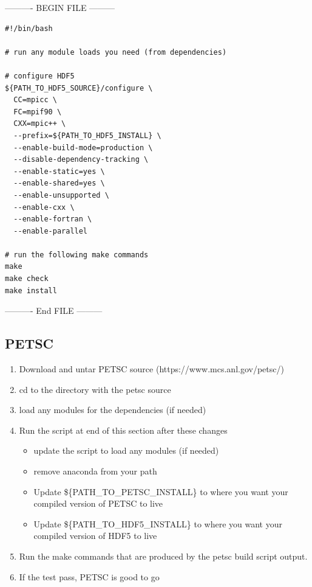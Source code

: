 \documentclass{article}
\begin{document}
---------- BEGIN FILE ---------
\begin{verbatim}
#!/bin/bash

# run any module loads you need (from dependencies)

# configure HDF5
${PATH_TO_HDF5_SOURCE}/configure \
  CC=mpicc \
  FC=mpif90 \
  CXX=mpic++ \
  --prefix=${PATH_TO_HDF5_INSTALL} \
  --enable-build-mode=production \
  --disable-dependency-tracking \
  --enable-static=yes \
  --enable-shared=yes \
  --enable-unsupported \
  --enable-cxx \
  --enable-fortran \
  --enable-parallel

# run the following make commands
make 
make check 
make install
\end{verbatim}
---------- End FILE ---------

\subsection{PETSC} %
\label{sub:petsc}
\begin{enumerate}
  \item Download and untar PETSC source (https://www.mcs.anl.gov/petsc/)
  \item cd to the directory with the petsc source
  \item load any modules for the dependencies (if needed)
  \item Run the script at end of this section after these changes
  \begin{itemize}
    \item update the script to load any modules (if needed)
    \item remove anaconda from your path
    \item Update \$\{PATH\_TO\_PETSC\_INSTALL\} to where you want your compiled version of PETSC to live
    \item Update \$\{PATH\_TO\_HDF5\_INSTALL\} to where you want your compiled version of HDF5 to live
  \end{itemize}
  \item Run the make commands that are produced by the petsc build script output.
  \item If the test pass, PETSC is good to go
\end{enumerate}
\end{document}
